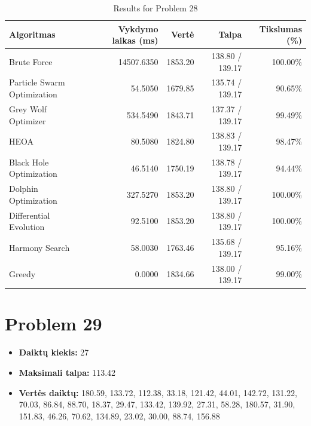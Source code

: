 \documentclass[a4paper,11pt]{article}
\begin{document}
\begin{table}[h!]
\centering
\begin{tabular}{lrrrr}
\toprule
\textbf{Algoritmas} & \textbf{Vykdymo laikas (ms)} & \textbf{Vertė} & \textbf{Talpa} & \textbf{Tikslumas (\%)} \\
\midrule
Brute Force & 14507.6350 & 1853.20 & 138.80 / 139.17 & 100.00\% \\
Particle Swarm Optimization & 54.5050 & 1679.85 & 135.74 / 139.17 & 90.65\% \\
Grey Wolf Optimizer & 534.5490 & 1843.71 & 137.37 / 139.17 & 99.49\% \\
HEOA & 80.5080 & 1824.80 & 138.83 / 139.17 & 98.47\% \\
Black Hole Optimization & 46.5140 & 1750.19 & 138.78 / 139.17 & 94.44\% \\
Dolphin Optimization & 327.5270 & 1853.20 & 138.80 / 139.17 & 100.00\% \\
Differential Evolution & 92.5100 & 1853.20 & 138.80 / 139.17 & 100.00\% \\
Harmony Search & 58.0030 & 1763.46 & 135.68 / 139.17 & 95.16\% \\
Greedy & 0.0000 & 1834.66 & 138.00 / 139.17 & 99.00\% \\
\bottomrule
\end{tabular}
\caption{Results for Problem 28}
\end{table}
\clearpage

\section*{Problem 29}
\begin{itemize}
    \item \textbf{Daiktų kiekis:} 27
    \item \textbf{Maksimali talpa:} 113.42
    \item \textbf{Vertės daiktų:} 180.59, 133.72, 112.38, 33.18, 121.42, 44.01, 142.72, 131.22, 70.03, 86.84, 88.70, 18.37, 29.47, 133.42, 139.92, 27.31, 58.28, 180.57, 31.90, 151.83, 46.26, 70.62, 134.89, 23.02, 30.00, 88.74, 156.88
\end{itemize}
\end{document}
